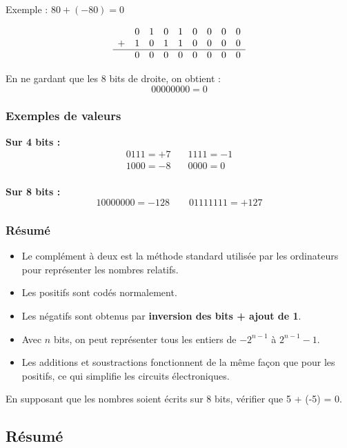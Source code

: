 \documentclass[11pt, a4paper]{book}
\begin{document}
Exemple : $80 + (-80) = 0$

\[
\begin{array}{ccccccccc}
  & 0 & 1 & 0 & 1 & 0 & 0 & 0 & 0 \\
+ & 1 & 0 & 1 & 1 & 0 & 0 & 0 & 0 \\ \hline
  & 0 & 0 & 0 & 0 & 0 & 0 & 0 & 0 \\
\end{array}
\]

En ne gardant que les 8 bits de droite, on obtient : 
\[
00000000 = 0
\]

\subsubsection{Exemples de valeurs}

\textbf{Sur 4 bits :}  
\[
\begin{array}{ll}
0111 = +7 & \quad 1111 = -1 \\
1000 = -8 & \quad 0000 = 0 \\
\end{array}
\]

\textbf{Sur 8 bits :}  
\[
10000000 = -128 \qquad 01111111 = +127
\]

\subsubsection{Résumé}

\begin{itemize}
  \item Le complément à deux est la méthode standard utilisée par les ordinateurs pour représenter les nombres relatifs.  
  \item Les positifs sont codés normalement.  
  \item Les négatifs sont obtenus par \textbf{inversion des bits + ajout de 1}.  
  \item Avec $n$ bits, on peut représenter tous les entiers de $-2^{n-1}$ à $2^{n-1}-1$.  
  \item Les additions et soustractions fonctionnent de la même façon que pour les positifs, ce qui simplifie les circuits électroniques.  
\end{itemize}

\begin{exercice}
En supposant que les nombres soient écrits sur 8 bits, vérifier que 5 + (-5) = 0.
\end{exercice}


\subsection{Résumé}
\end{document}
